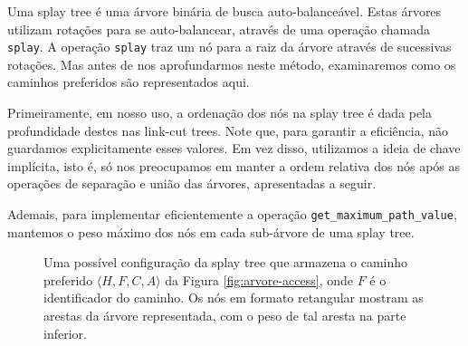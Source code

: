 Uma splay tree é uma árvore binária de busca auto-balanceável. Estas árvores utilizam rotações para se auto-balancear, através de uma operação chamada \texttt{splay}. A operação \texttt{splay} traz um nó para a raiz da árvore através de sucessivas rotações. Mas antes de nos aprofundarmos neste método, examinaremos como os caminhos preferidos são representados aqui.

Primeiramente, em nosso uso, a ordenação dos nós na splay tree é dada pela profundidade destes nas link-cut trees. Note que, para garantir a eficiência, não guardamos explicitamente esses valores. Em vez disso, utilizamos a ideia de chave implícita, isto é, só nos preocupamos em manter a ordem relativa dos nós após as operações de separação e união das árvores, apresentadas a seguir.

Ademais, para implementar eficientemente a operação \texttt{get\_maximum\_path\_value}, mantemos o peso máximo dos nós em cada sub-árvore de uma splay tree.

\begin{figure}
    \centering
    \caption{Uma possível configuração da splay tree que armazena o caminho preferido $\langle H,F,C,A \rangle$ da Figura \ref{fig:arvore-access}, onde $F$ é o identificador do caminho. Os nós em formato retangular mostram as arestas da árvore representada, com o peso de tal aresta na parte inferior.}
    \label{fig:splay-path}
\end{figure}

